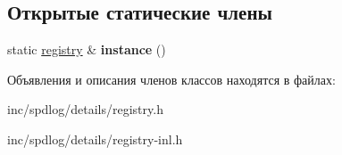 \subsection*{Открытые статические члены}
\begin{DoxyCompactItemize}
\item 
\mbox{\label{classspdlog_1_1details_1_1registry_aa03a75101aed166275ba27d0b2235e5d}} 
static \hyperlink{classspdlog_1_1details_1_1registry}{registry} \& {\bfseries instance} ()
\end{DoxyCompactItemize}


Объявления и описания членов классов находятся в файлах\+:\begin{DoxyCompactItemize}
\item 
inc/spdlog/details/registry.\+h\item 
inc/spdlog/details/registry-\/inl.\+h\end{DoxyCompactItemize}
